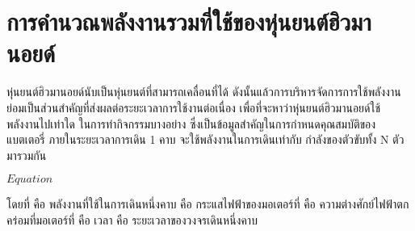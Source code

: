 \section{การคำนวณพลังงานรวมที่ใช้ของหุ่นยนต์ฮิวมานอยด์}
หุ่นยนต์ฮิวมานอยด์นับเป็นหุ่นยนต์ที่สามารถเคลื่อนที่ได้ ดังนั้นแล้วการบริหารจัดการการใช้พลังงาน 
ย่อมเป็นส่วนสำคัญที่ส่งผลต่อระยะเวลาการใช้งานต่อเนื่อง เพื่อที่จะหาว่าหุ่นยนต์ฮิวมานอยด์ใช้พลังงานไปเท่าใด
ในการทำกิจกรรมบางอย่าง ซึ่งเป็นข้อมูลสำคัญในการกำหนดคุณสมบัติของแบตเตอรี่ 
ภายในระยะเวลาการเดิน 1 คาบ จะใช้พลังงานในการเดินเท่ากับ กำลังของตัวขับทั้ง N ตัวมารวมกัน

$Equation$

โดยที่
 คือ พลังงานที่ใช้ในการเดินหนึ่งคาบ
 คือ กระแสไฟฟ้าของมอเตอร์ที่ 
	 คือ ความต่างศักย์ไฟฟ้าตกคร่อมที่มอเตอร์ที่   
	 คือ เวลา 
 คือ ระยะเวลาของวงจรเดินหนึ่งคาบ 
